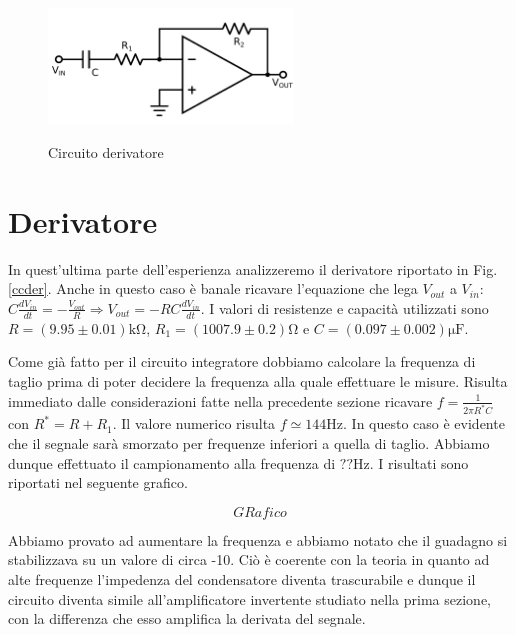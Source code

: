 \begin{figure}
	\caption{Circuito derivatore}
	\includegraphics[width=65mm]{ccder.pdf}
	\label{fig:ccder}
\end{figure}

\section{Derivatore}

In quest'ultima parte dell'esperienza analizzeremo il derivatore riportato in Fig. \ref{ccder}. Anche in questo caso è banale ricavare l'equazione che lega $V_{out}$ a $V_{in}$: $C\frac{dV_{in}}{dt}=-\frac{V_{out}}{R}\Rightarrow V_{out}=-RC\frac{dV_{in}}{dt}$.
I valori di resistenze e capacità utilizzati sono $R=(9.95 \pm 0.01)\si{\kilo\ohm}$, $R_1=(1007.9 \pm 0.2)\si{\ohm}$ e $C=(0.097 \pm 0.002) \si{\micro\farad}$.

Come già fatto per il circuito integratore dobbiamo calcolare la frequenza di taglio prima di poter decidere la frequenza alla quale effettuare le misure. Risulta immediato dalle considerazioni fatte nella precedente sezione ricavare $f=\frac{1}{2 \pi R^* C}$ con $R^*=R+R_1$. Il valore numerico risulta $f \simeq 144 \si{\hertz}$.
In questo caso è evidente che il segnale sarà smorzato per frequenze inferiori a quella di taglio. Abbiamo dunque effettuato il campionamento alla frequenza di $?? \si{\hertz}$. I risultati sono riportati nel seguente grafico.

$$GRafico$$

Abbiamo provato ad aumentare la frequenza e abbiamo notato che il guadagno si stabilizzava su un valore di circa -10. Ciò è coerente con la teoria in quanto ad alte frequenze l'impedenza del condensatore diventa trascurabile e dunque il circuito diventa simile all'amplificatore invertente studiato nella prima sezione, con la differenza che esso amplifica la derivata del segnale.